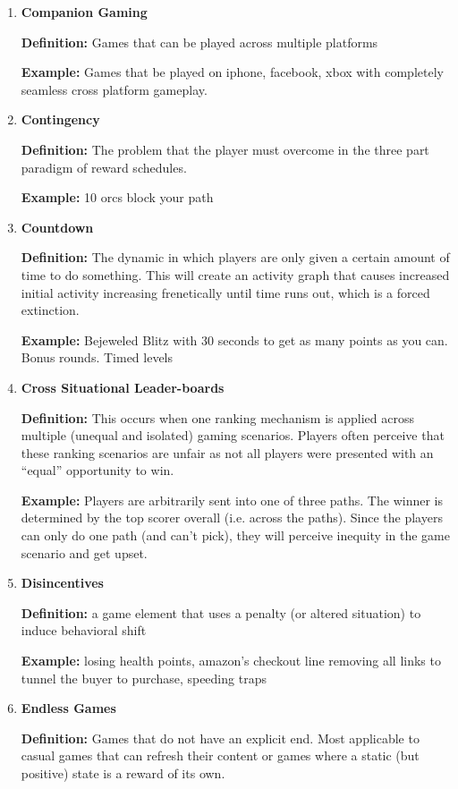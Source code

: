 \begin{enumerate}
\item \textbf{Companion Gaming}

\textbf{Definition:} Games that can be played across multiple platforms

\textbf{Example:} Games that be played on iphone, facebook, xbox with completely seamless cross platform gameplay.

\item \textbf{Contingency}

\textbf{Definition:} The problem that the player must overcome in the three part paradigm of reward schedules.

\textbf{Example:} 10 orcs block your path

\item \textbf{Countdown}

\textbf{Definition:} The dynamic in which players are only given a certain amount of time to do something. This will create an activity graph that causes increased initial activity increasing frenetically until time runs out, which is a forced extinction.

\textbf{Example:} Bejeweled Blitz with 30 seconds to get as many points as you can. Bonus rounds. Timed levels

\item \textbf{Cross Situational Leader-boards}

\textbf{Definition:} This occurs when one ranking mechanism is applied across multiple (unequal and isolated) gaming scenarios. Players often perceive that these ranking scenarios are unfair as not all players were presented with an “equal” opportunity to win.

\textbf{Example:} Players are arbitrarily sent into one of three paths. The winner is determined by the top scorer overall (i.e. across the paths). Since the players can only do one path (and can't pick), they will perceive inequity in the game scenario and get upset.

\item \textbf{Disincentives}

\textbf{Definition: }a game element that uses a penalty (or altered situation) to induce behavioral shift

\textbf{Example:} losing health points, amazon’s checkout line removing all links to tunnel the buyer to purchase, speeding traps

\item \textbf{Endless Games}

\textbf{Definition:} Games that do not have an explicit end. Most applicable to casual games that can refresh their content or games where a static (but positive) state is a reward of its own.


\end{enumerate}
